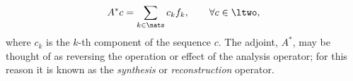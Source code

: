 \begin{align}
  A^* c = \sum_{k \in \nats} c_k f_k, \qquad \forall c \in \ltwo,\notag
  \label{}
\end{align}
where $c_k$ is the $k$-th component of the sequence $c$. The adjoint, $A^*$, may be thought of as reversing the operation or effect of the analysis operator; for this reason it is known as the \emph{synthesis} or \emph{reconstruction} operator.
\begin{comment}
By composing the analysis and the synthesis operators, we obtain the \emph{frame operator} $F:\LtwoR \to \LtwoR$ defined as: 
\begin{align}
  F f := AA^*f = \sum_{k \in \nats} \langle f, f_k \rangle f_k, \notag
\end{align}
for all $f \in \LtwoR$.
The frame operator $F$ is bounded, invertible, and self-adjoint\footnote{See \cite{Christensen2001} and the references therein.}. This yields the representation result
\begin{align}
  f = FF^{-1}f = \sumn \langle f, F^{-1} f_k\rangle f_k. \notag 
  \label{}
\end{align}
The sequence $\{F^{-1}f_k\}_{k \in \nats}$ is also a frame, and it is called the \emph{canonical dual} of $\{f_k\}_{k \in \nats}$. A frame will generally have other duals besides the canonical dual. That is, there exists  sequences $\{\tilde{f}_k\}_{k \in \nats}$ besides the canonical sequence such that 
\begin{align}
  f = \sumn \langle f, \tilde{f}_k\rangle f_k \qquad \forall f \in \LtwoR.
  \label{eq:dual}
\end{align}
\end{comment}



